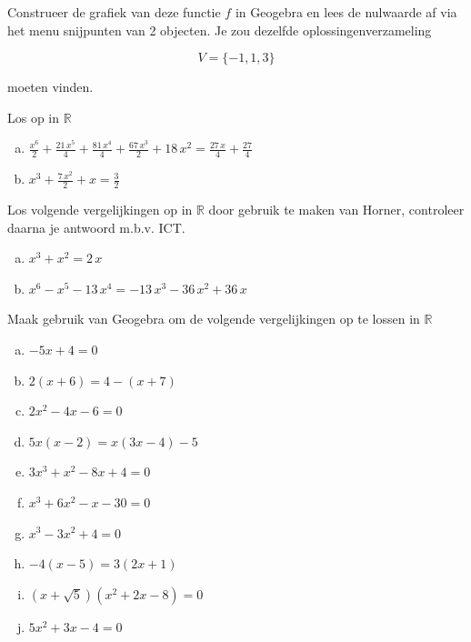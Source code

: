 \documentclass[12pt]{article}
\begin{document}
Construeer de grafiek van deze functie $f$ in Geogebra en lees de nulwaarde af via het menu snijpunten van 2 objecten. Je zou dezelfde oplossingenverzameling

$$V=\{-1, 1, 3\}$$

moeten vinden.

\begin{oefening}
Los op in $\mathbb{R}$\\
\begin{enumerate}[(a)]
  \itemsep2em
  \item $\displaystyle\frac{{x}^{6}}{2}+\frac{21\,{x}^{5}}{4}+\frac{81\,{x}^{4}}{4}+\frac{67\,{x}^{3}}{2}+18\,{x}^{2}=\frac{27\,x}{4}+\frac{27}{4}$
  \item $\displaystyle{x}^{3}+\frac{7\,{x}^{2}}{2}+x=\frac{3}{2}$
\end{enumerate}
\end{oefening}

\begin{oefening}
Los volgende vergelijkingen op in $\mathbb{R}$ door gebruik te maken van Horner, controleer daarna je antwoord m.b.v. ICT.\\
\begin{enumerate}[(a)]
  \itemsep1em
  \item $\displaystyle{x}^{3}+{x}^{2}=2\,x$
  \item $\displaystyle{x}^{6}-{x}^{5}-13\,{x}^{4}=-13\,{x}^{3}-36\,{x}^{2}+36\,x$
\end{enumerate}
\end{oefening}

\begin{oefening}
Maak gebruik van Geogebra om de volgende vergelijkingen op te lossen in $\mathbb{R}$
\begin{enumerate}[(a)]
  \itemsep0.7em
  \item $-5x+4=0$
  \item $2(x+6)=4-(x+7)$
  \item $2x^2-4x-6=0$
  \item $5x(x-2)=x(3x-4)-5$
  \item $3x^3+x^2-8x+4=0$
  \item $x^3+6x^2-x-30=0$
  \item $x^3-3x^2+4=0$
  \item $-4(x-5)=3(2x+1)$
  \item $(x+\sqrt{5})(x^2+2x-8)=0$
  \item $5x^2+3x-4=0$
\end{enumerate}
\end{oefening}
\end{document}
